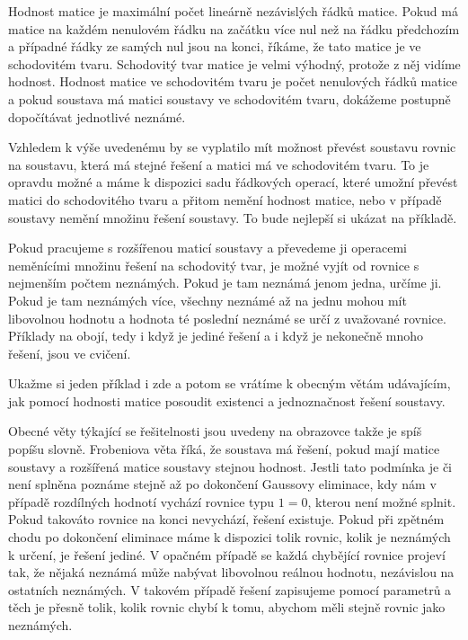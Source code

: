 \documentclass[12pt]{article}
\begin{document}
Hodnost matice je maximální počet lineárně nezávislých řádků matice. Pokud má matice na každém nenulovém řádku na začátku více nul než na řádku předchozím a případné řádky ze samých nul jsou na konci, říkáme, že tato matice je ve schodovitém tvaru. Schodovitý tvar matice je velmi výhodný, protože z něj vidíme hodnost. Hodnost matice ve schodovitém tvaru je počet nenulových řádků matice a pokud soustava má matici soustavy ve schodovitém tvaru, dokážeme postupně dopočítávat jednotlivé neznámé. 

Vzhledem k výše uvedenému by se vyplatilo mít možnost převést soustavu rovnic na soustavu, která má stejné řešení a matici má ve schodovitém tvaru. To je opravdu možné a máme k dispozici sadu řádkových operací, které umožní převést matici do schodovitého tvaru a přitom nemění hodnost matice, nebo v případě soustavy nemění množinu řešení soustavy. To bude nejlepší si ukázat na příkladě.

Pokud pracujeme s rozšířenou maticí soustavy a převedeme ji operacemi neměnícími množinu řešení na schodovitý tvar, je možné vyjít od rovnice s nejmenším počtem neznámých. Pokud je tam neznámá jenom jedna, určíme ji. Pokud je tam neznámých více, všechny neznámé až na jednu mohou mít libovolnou hodnotu a hodnota té poslední neznámé se určí z uvažované rovnice. Příklady na obojí, tedy i když je jediné řešení a i když je nekonečně mnoho řešení, jsou ve cvičení. 

Ukažme si jeden příklad i zde a potom se vrátíme k obecným větám udávajícím, jak pomocí hodnosti matice posoudit existenci a jednoznačnost řešení soustavy.



Obecné věty týkající se řešitelnosti jsou uvedeny na obrazovce takže je spíš popíšu slovně. Frobeniova věta říká, že soustava má řešení, pokud mají matice soustavy a rozšířená matice soustavy stejnou hodnost. Jestli tato podmínka je či není splněna poznáme stejně až po dokončení Gaussovy eliminace, kdy nám v případě rozdílných hodnotí vychází rovnice typu $1=0$, kterou není možné splnit. Pokud takováto rovnice na konci nevychází, řešení existuje. Pokud při zpětném chodu po dokončení eliminace máme k dispozici tolik rovnic, kolik je neznámých k určení, je řešení jediné. V opačném případě se každá chybějící rovnice projeví tak, že nějaká neznámá může nabývat libovolnou reálnou hodnotu, nezávislou na ostatních neznámých. V takovém případě řešení zapisujeme pomocí parametrů a těch je přesně tolik, kolik rovnic chybí k tomu, abychom měli stejně rovnic jako neznámých.
\end{document}
